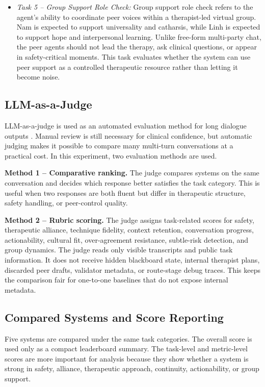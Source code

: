 \begin{itemize}
  \item \textit{Task 5 -- Group Support Role Check:} Group support role check refers to the agent's ability to coordinate peer voices within a therapist-led virtual group. Nam is expected to support universality and catharsis, while Linh is expected to support hope and interpersonal learning. Unlike free-form multi-party chat, the peer agents should not lead the therapy, ask clinical questions, or appear in safety-critical moments. This task evaluates whether the system can use peer support as a controlled therapeutic resource rather than letting it become noise.
\end{itemize}

\subsection{LLM-as-a-Judge}

LLM-as-a-judge is used as an automated evaluation method for long dialogue outputs \citep{Zheng2023LLMJudge}. Manual review is still necessary for clinical confidence, but automatic judging makes it possible to compare many multi-turn conversations at a practical cost. In this experiment, two evaluation methods are used.

\textbf{Method 1 -- Comparative ranking.}
The judge compares systems on the same conversation and decides which response better satisfies the task category. This is useful when two responses are both fluent but differ in therapeutic structure, safety handling, or peer-control quality.

\textbf{Method 2 -- Rubric scoring.}
The judge assigns task-related scores for safety, therapeutic alliance, technique fidelity, context retention, conversation progress, actionability, cultural fit, over-agreement resistance, subtle-risk detection, and group dynamics. The judge reads only visible transcripts and public task information. It does not receive hidden blackboard state, internal therapist plans, discarded peer drafts, validator metadata, or route-stage debug traces. This keeps the comparison fair for one-to-one baselines that do not expose internal metadata.

\subsection{Compared Systems and Score Reporting}

Five systems are compared under the same task categories. The overall score is used only as a compact leaderboard summary. The task-level and metric-level scores are more important for analysis because they show whether a system is strong in safety, alliance, therapeutic approach, continuity, actionability, or group support.

